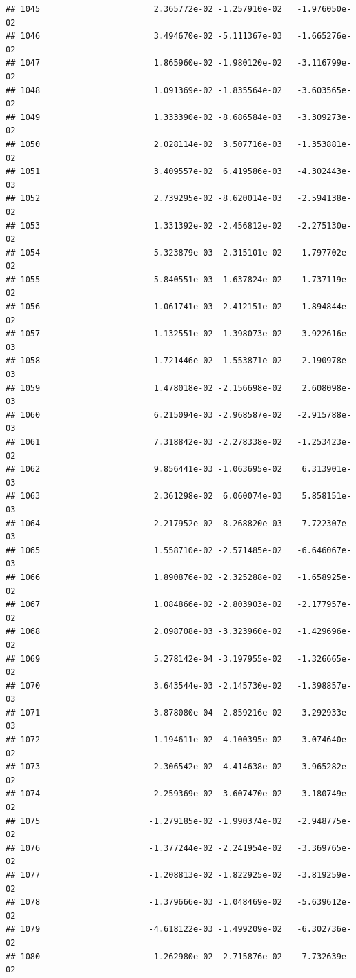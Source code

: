 \documentclass[
]{article}
\begin{document}
\begin{verbatim}
## 1045                       2.365772e-02 -1.257910e-02   -1.976050e-02
## 1046                       3.494670e-02 -5.111367e-03   -1.665276e-02
## 1047                       1.865960e-02 -1.980120e-02   -3.116799e-02
## 1048                       1.091369e-02 -1.835564e-02   -3.603565e-02
## 1049                       1.333390e-02 -8.686584e-03   -3.309273e-02
## 1050                       2.028114e-02  3.507716e-03   -1.353881e-02
## 1051                       3.409557e-02  6.419586e-03   -4.302443e-03
## 1052                       2.739295e-02 -8.620014e-03   -2.594138e-02
## 1053                       1.331392e-02 -2.456812e-02   -2.275130e-02
## 1054                       5.323879e-03 -2.315101e-02   -1.797702e-02
## 1055                       5.840551e-03 -1.637824e-02   -1.737119e-02
## 1056                       1.061741e-03 -2.412151e-02   -1.894844e-02
## 1057                       1.132551e-02 -1.398073e-02   -3.922616e-03
## 1058                       1.721446e-02 -1.553871e-02    2.190978e-03
## 1059                       1.478018e-02 -2.156698e-02    2.608098e-03
## 1060                       6.215094e-03 -2.968587e-02   -2.915788e-03
## 1061                       7.318842e-03 -2.278338e-02   -1.253423e-02
## 1062                       9.856441e-03 -1.063695e-02    6.313901e-03
## 1063                       2.361298e-02  6.060074e-03    5.858151e-03
## 1064                       2.217952e-02 -8.268820e-03   -7.722307e-03
## 1065                       1.558710e-02 -2.571485e-02   -6.646067e-03
## 1066                       1.890876e-02 -2.325288e-02   -1.658925e-02
## 1067                       1.084866e-02 -2.803903e-02   -2.177957e-02
## 1068                       2.098708e-03 -3.323960e-02   -1.429696e-02
## 1069                       5.278142e-04 -3.197955e-02   -1.326665e-02
## 1070                       3.643544e-03 -2.145730e-02   -1.398857e-03
## 1071                      -3.878080e-04 -2.859216e-02    3.292933e-03
## 1072                      -1.194611e-02 -4.100395e-02   -3.074640e-02
## 1073                      -2.306542e-02 -4.414638e-02   -3.965282e-02
## 1074                      -2.259369e-02 -3.607470e-02   -3.180749e-02
## 1075                      -1.279185e-02 -1.990374e-02   -2.948775e-02
## 1076                      -1.377244e-02 -2.241954e-02   -3.369765e-02
## 1077                      -1.208813e-02 -1.822925e-02   -3.819259e-02
## 1078                      -1.379666e-03 -1.048469e-02   -5.639612e-02
## 1079                      -4.618122e-03 -1.499209e-02   -6.302736e-02
## 1080                      -1.262980e-02 -2.715876e-02   -7.732639e-02

\end{verbatim}
\end{document}
